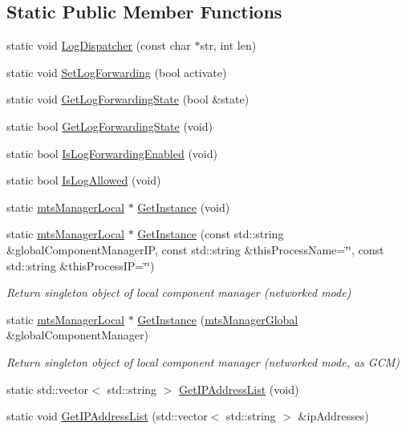\subsection*{Static Public Member Functions}
\begin{DoxyCompactItemize}
\item 
static void \hyperlink{classmts_manager_local_aa5d9ccfbe55e23838a39dae4d707301b}{Log\-Dispatcher} (const char $\ast$str, int len)
\item 
static void \hyperlink{classmts_manager_local_a77e6f7ca43375b8af362ea43db802c4b}{Set\-Log\-Forwarding} (bool activate)
\item 
static void \hyperlink{classmts_manager_local_ab46bcc3be5e9fd56b737671147173729}{Get\-Log\-Forwarding\-State} (bool \&state)
\item 
static bool \hyperlink{classmts_manager_local_a6c96baf1f124ab0fe98ae6e8482c0c4c}{Get\-Log\-Forwarding\-State} (void)
\item 
static bool \hyperlink{classmts_manager_local_a7506b986c61d60bf2e35d80ac76eef64}{Is\-Log\-Forwarding\-Enabled} (void)
\item 
static bool \hyperlink{classmts_manager_local_a52c0b11e6ba9331c076bd4c1c75462c6}{Is\-Log\-Allowed} (void)
\item 
static \hyperlink{classmts_manager_local}{mts\-Manager\-Local} $\ast$ \hyperlink{classmts_manager_local_a025cb3746e1e69b07723066b562ac5cd}{Get\-Instance} (void)
\item 
static \hyperlink{classmts_manager_local}{mts\-Manager\-Local} $\ast$ \hyperlink{classmts_manager_local_a9b41b6aa95fa8d557bb22f9bc40ac127}{Get\-Instance} (const std\-::string \&global\-Component\-Manager\-I\-P, const std\-::string \&this\-Process\-Name=\char`\"{}\char`\"{}, const std\-::string \&this\-Process\-I\-P=\char`\"{}\char`\"{})
\begin{DoxyCompactList}\small\item\em Return singleton object of local component manager (networked mode) \end{DoxyCompactList}\item 
static \hyperlink{classmts_manager_local}{mts\-Manager\-Local} $\ast$ \hyperlink{classmts_manager_local_a50daf201befe4d930344730cb0d9a2e1}{Get\-Instance} (\hyperlink{classmts_manager_global}{mts\-Manager\-Global} \&global\-Component\-Manager)
\begin{DoxyCompactList}\small\item\em Return singleton object of local component manager (networked mode, as G\-C\-M) \end{DoxyCompactList}\item 
static std\-::vector$<$ std\-::string $>$ \hyperlink{classmts_manager_local_a50b47a2ab03e49e5b63a7c2a3bc75ed2}{Get\-I\-P\-Address\-List} (void)
\item 
static void \hyperlink{classmts_manager_local_a21bb40e91c1db5cbb31b0dad3de1e10f}{Get\-I\-P\-Address\-List} (std\-::vector$<$ std\-::string $>$ \&ip\-Addresses)
\end{DoxyCompactItemize}
